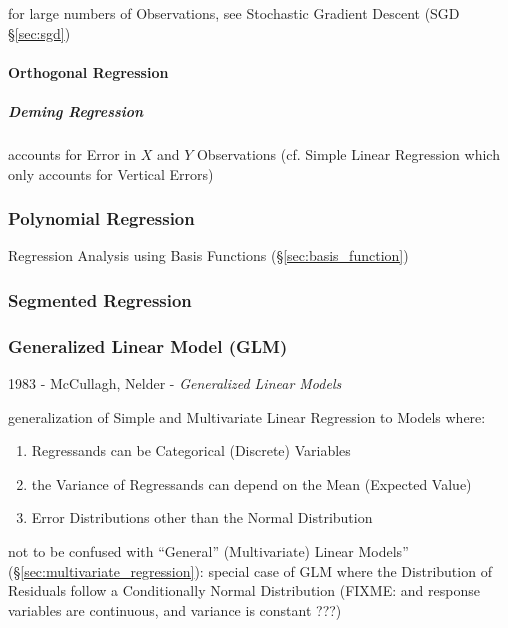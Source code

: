 for large numbers of Observations, see Stochastic Gradient Descent (SGD
\S\ref{sec:sgd})



\paragraph{Orthogonal Regression}\label{sec:orthogonal_regression}\hfill

\subparagraph{Deming Regression}\label{sec:deming_regression}\hfill

accounts for Error in $X$ and $Y$ Observations (cf. Simple Linear Regression
which only accounts for Vertical Errors)



\subsubsection{Polynomial Regression}\label{sec:polynomial_regression}

Regression Analysis using Basis Functions (\S\ref{sec:basis_function})



\subsubsection{Segmented Regression}\label{sec:segmented_regression}

\subsubsection{Generalized Linear Model (GLM)}\label{sec:glm}

1983 - McCullagh, Nelder - \emph{Generalized Linear Models}

generalization of Simple and Multivariate Linear Regression to Models where:
\begin{enumerate}
  \item Regressands can be Categorical (Discrete) Variables
  \item the Variance of Regressands can depend on the Mean (Expected Value)
  \item Error Distributions other than the Normal Distribution
\end{enumerate}

not to be confused with ``General'' (Multivariate) Linear Models''
(\S\ref{sec:multivariate_regression}): special case of GLM where the
Distribution of Residuals follow a Conditionally Normal Distribution
(FIXME: and response variables are continuous, and variance is constant ???)

